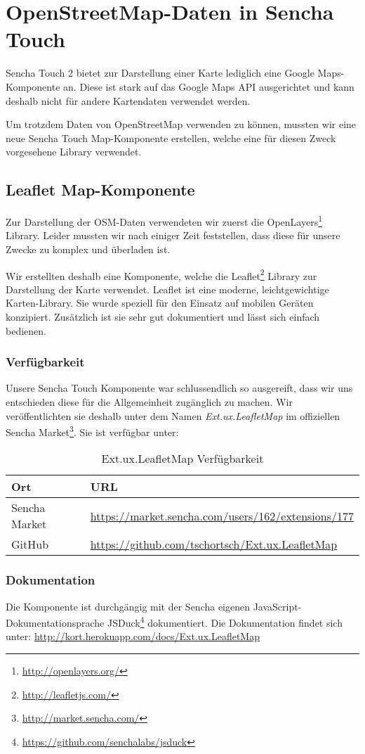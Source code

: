 \chapter{OpenStreetMap-Daten in Sencha Touch}
\label{leaflet-sencha-komponente}

Sencha Touch 2 bietet zur Darstellung einer Karte lediglich eine Google Maps-Komponente an.
Diese ist stark auf das Google Maps API ausgerichtet und kann deshalb nicht für andere Kartendaten verwendet werden.

Um trotzdem Daten von OpenStreetMap verwenden zu können, mussten wir eine neue Sencha Touch Map-Komponente erstellen, welche eine für diesen Zweck vorgesehene Library verwendet.

\section{Leaflet Map-Komponente}

Zur Darstellung der OSM-Daten verwendeten wir zuerst die OpenLayers\footnote{\url{http://openlayers.org/}} Library.
Leider mussten wir nach einiger Zeit feststellen, dass diese für unsere Zwecke zu komplex und überladen ist.

Wir erstellten deshalb eine Komponente, welche die Leaflet\footnote{\url{http://leafletjs.com/}} Library zur Darstellung der Karte verwendet.
Leaflet ist eine moderne, leichtgewichtige Karten-Library.
Sie wurde speziell für den Einsatz auf mobilen Geräten konzipiert.
Zusätzlich ist sie sehr gut dokumentiert und lässt sich einfach bedienen.

\subsection{Verfügbarkeit}
Unsere Sencha Touch Komponente war schlussendlich so ausgereift, dass wir uns entschieden diese für die Allgemeinheit zugänglich zu machen.
Wir veröffentlichten sie deshalb unter dem Namen \emph{Ext.ux.LeafletMap} im offiziellen Sencha Market\footnote{\url{http://market.sencha.com/}}.
Sie ist verfügbar unter:

\begin{table}[H]
\centering
\begin{tabular}{|p{0.2\twocelltabwidth}|p{0.8\twocelltabwidth}|}
\hline 
\textbf{Ort} & \textbf{URL} \\ 
\hline 
Sencha Market & \url{https://market.sencha.com/users/162/extensions/177} \\ 
\hline 
GitHub & \url{https://github.com/tschortsch/Ext.ux.LeafletMap} \\ 
\hline 
\end{tabular} 
\caption{Ext.ux.LeafletMap Verfügbarkeit}
\label{leafletmap-availiblity}
\end{table}

\subsection{Dokumentation}
Die Komponente ist durchgängig mit der Sencha eigenen JavaScript-Dokumentationsprache JSDuck\footnote{\url{https://github.com/senchalabs/jsduck}} dokumentiert. Die Dokumentation findet sich unter: \url{http://kort.herokuapp.com/docs/Ext.ux.LeafletMap}